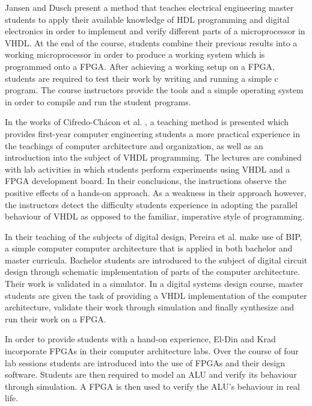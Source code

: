 \documentclass[openright]{template/uva-bachelor-thesis}
\begin{document}

Jansen and Dusch \cite{jansen2014every} present a method that teaches electrical engineering master students to apply their available knowledge of HDL programming and digital electronics in order to implement and verify different parts of a microprocessor in VHDL. At the end of the course, students combine their previous results into a working microprocessor in order to produce a working system which is programmed onto a FPGA. After achieving a working setup on a FPGA, students are required to test their work by writing and running a simple c program. The course instructors provide the tools and a simple operating system in order to compile and run the student programs. 

In the works of Cifredo-Ch\'acon et al. \cite{cifredo2015computer}, a teaching method is presented which provides first-year computer engineering students a more practical experience in the teachings of computer architecture and organization, as well as an introduction into the subject of VHDL programming. The lectures are combined with lab activities in which students perform experiments using VHDL and a FPGA development board. 
In their conclusions, the instructions observe the positive effects of a hands-on approach. As a weakness in their approach however, the instructors detect the difficulty students experience in adopting the parallel behaviour of VHDL as opposed to the familiar, imperative style of programming. 

In their teaching of the subjects of digital design, Pereira et al. \cite{pereira2012basic} make use of BIP, a simple computer computer architecture that is applied in both bachelor and master curricula. Bachelor students are introduced to the subject of digital circuit design through schematic implementation of parts of the computer architecture. Their work is validated in a simulator. In a digital systems design course, master students are given the task of providing a VHDL implementation of the computer architecture, validate their work through simulation and finally synthesize and run their work on a FPGA. 

In order to provide students with a hand-on experience, El-Din and Krad \cite{el2011teaching} incorporate FPGAs in their computer architecture labs. Over the course of four lab sessions students are introduced into the use of FPGAs and their design software. Students are then required to model an ALU and verify its behaviour through simulation. A FPGA is then used to verify the ALU's behaviour in real life. 
\end{document}
